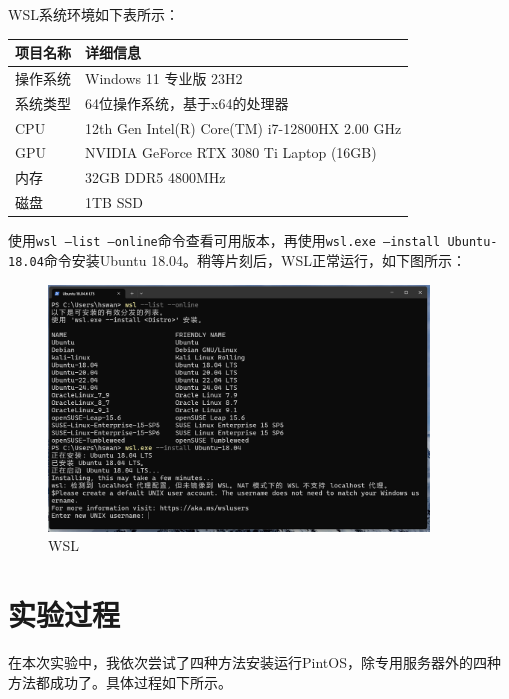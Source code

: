\documentclass{article}
\begin{document}
WSL系统环境如下表所示：

\begin{center}
	\begin{tabular}{| >{\centering\arraybackslash}m{3cm} | >{\centering\arraybackslash}m{9cm} |}    
		\hline  
		\textbf{项目名称} & \textbf{详细信息} \\
		\hline  
		操作系统 & Windows 11 专业版 23H2 \\  
		\hline  
		系统类型 & 64位操作系统，基于x64的处理器 \\  
		\hline
		CPU & 12th Gen Intel(R) Core(TM) i7-12800HX 2.00 GHz \\  
		\hline 
		GPU & NVIDIA GeForce RTX 3080 Ti Laptop (16GB)\\  
		\hline 
		内存 & 32GB DDR5 4800MHz \\  
		\hline 
		磁盘 & 1TB SSD \\  
		\hline 		
	\end{tabular}
\end{center}

使用\texttt{wsl --list --online}命令查看可用版本，再使用\texttt{wsl.exe --install Ubuntu-18.04}命令安装Ubuntu 18.04。稍等片刻后，WSL正常运行，如下图所示：

\begin{figure}[H]
	\centering
	\includegraphics[width=0.9\textwidth]{img/wsl_install.png}
	\caption{WSL}
\end{figure}

\normalsize

\section{实验过程}

在本次实验中，我依次尝试了四种方法安装运行PintOS，除专用服务器外的四种方法都成功了。具体过程如下所示。
\end{document}
